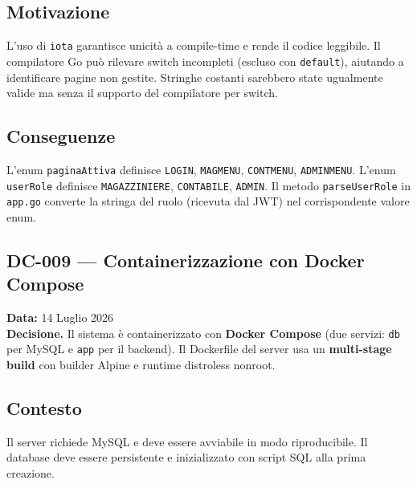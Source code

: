\documentclass[a4paper,12pt]{article}
\begin{document}
\subsection*{Motivazione}
L'uso di \texttt{iota} garantisce unicit\`{a} a compile-time e rende il codice leggibile. Il compilatore Go può rilevare switch incompleti (escluso con \texttt{default}), aiutando a identificare pagine non gestite. Stringhe costanti sarebbero state ugualmente valide ma senza il supporto del compilatore per switch.

\subsection*{Conseguenze}
L'enum \texttt{paginaAttiva} definisce \texttt{LOGIN}, \texttt{MAGMENU}, \texttt{CONTMENU}, \texttt{ADMINMENU}. L'enum \texttt{userRole} definisce \texttt{MAGAZZINIERE}, \texttt{CONTABILE}, \texttt{ADMIN}. Il metodo \texttt{parseUserRole} in \texttt{app.go} converte la stringa del ruolo (ricevuta dal JWT) nel corrispondente valore enum.

\begin{decisionbox}
\section*{DC-009 --- Containerizzazione con Docker Compose}
\textbf{Data:} 14 Luglio 2026\\
\textbf{Decisione.} Il sistema \`{e} containerizzato con \textbf{Docker Compose} (due servizi: \texttt{db} per MySQL e \texttt{app} per il backend). Il Dockerfile del server usa un \textbf{multi-stage build} con builder Alpine e runtime distroless nonroot.
\end{decisionbox}

\subsection*{Contesto}
Il server richiede MySQL e deve essere avviabile in modo riproducibile. Il database deve essere persistente e inizializzato con script SQL alla prima creazione.

\end{document}
